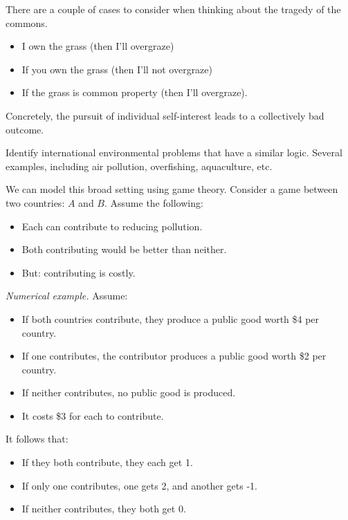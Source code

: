 \documentclass{article}
\begin{document}
  There are a couple of cases to consider when thinking about the tragedy of the commons.

  \begin{itemize}
    \item I own the grass (then I'll overgraze)
    \item If you own the grass (then I'll not overgraze)
    \item If the grass is common property (then I'll overgraze).
  \end{itemize}

  Concretely, the pursuit of individual self-interest leads to a collectively bad outcome.

  Identify international environmental problems that have a similar logic.  Several examples, including air pollution, overfishing, aquaculture, etc.

  We can model this broad setting using game theory.  Consider a game between two countries: $A$ and $B$.  Assume the following:

  \begin{itemize}
    \item Each can contribute to reducing pollution.
    \item Both contributing would be better than neither.
    \item But: contributing is costly.
  \end{itemize}

  {\it Numerical example.} Assume:

  \begin{itemize}
    \item If both countries contribute, they produce a public good worth \$4 per country.
    \item If one contributes, the contributor produces a public good worth \$2 per country.
    \item If neither contributes, no public good is produced.
    \item It costs \$3 for each to contribute.
  \end{itemize}

  It follows that:

  \begin{itemize}
    \item If they both contribute, they each get 1.
    \item If only one contributes, one gets 2, and another gets -1.
    \item If neither contributes, they both get 0.
  \end{itemize}
\end{document}

